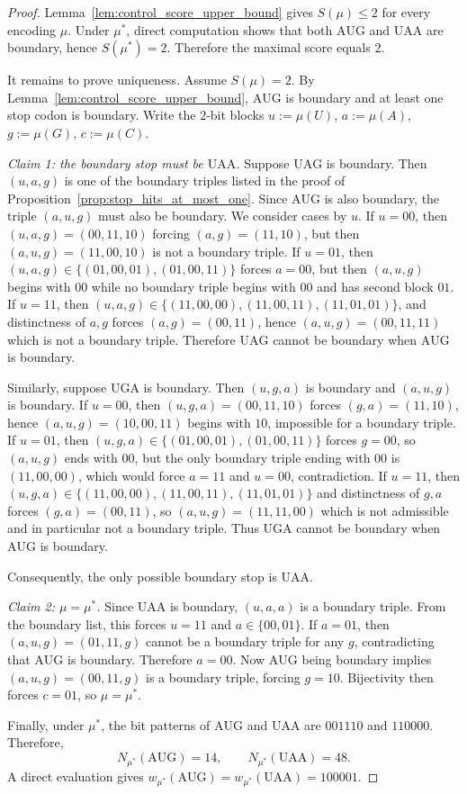 \begin{proof}
Lemma~\ref{lem:control_score_upper_bound} gives $S(\mu)\le 2$ for every encoding $\mu$.
Under $\mu^\ast$, direct computation shows that both $\mathrm{AUG}$ and $\mathrm{UAA}$ are boundary, hence $S(\mu^\ast)=2$.
Therefore the maximal score equals $2$.

It remains to prove uniqueness.
Assume $S(\mu)=2$.
By Lemma~\ref{lem:control_score_upper_bound}, $\mathrm{AUG}$ is boundary and at least one stop codon is boundary.
Write the $2$-bit blocks $u:=\mu(U)$, $a:=\mu(A)$, $g:=\mu(G)$, $c:=\mu(C)$.

\emph{Claim 1: the boundary stop must be $\mathrm{UAA}$.}
Suppose $\mathrm{UAG}$ is boundary.
Then $(u,a,g)$ is one of the boundary triples listed in the proof of Proposition~\ref{prop:stop_hits_at_most_one}.
Since $\mathrm{AUG}$ is also boundary, the triple $(a,u,g)$ must also be boundary.
We consider cases by $u$.
If $u=00$, then $(u,a,g)=(00,11,10)$ forcing $(a,g)=(11,10)$, but then $(a,u,g)=(11,00,10)$ is not a boundary triple.
If $u=01$, then $(u,a,g)\in\{(01,00,01),(01,00,11)\}$ forces $a=00$, but then $(a,u,g)$ begins with $00$ while no boundary triple begins with $00$ and has second block $01$.
If $u=11$, then $(u,a,g)\in\{(11,00,00),(11,00,11),(11,01,01)\}$, and distinctness of $a,g$ forces $(a,g)=(00,11)$, hence $(a,u,g)=(00,11,11)$ which is not a boundary triple.
Therefore $\mathrm{UAG}$ cannot be boundary when $\mathrm{AUG}$ is boundary.

Similarly, suppose $\mathrm{UGA}$ is boundary.
Then $(u,g,a)$ is boundary and $(a,u,g)$ is boundary.
If $u=00$, then $(u,g,a)=(00,11,10)$ forces $(g,a)=(11,10)$, hence $(a,u,g)=(10,00,11)$ begins with $10$, impossible for a boundary triple.
If $u=01$, then $(u,g,a)\in\{(01,00,01),(01,00,11)\}$ forces $g=00$, so $(a,u,g)$ ends with $00$, but the only boundary triple ending with $00$ is $(11,00,00)$, which would force $a=11$ and $u=00$, contradiction.
If $u=11$, then $(u,g,a)\in\{(11,00,00),(11,00,11),(11,01,01)\}$ and distinctness of $g,a$ forces $(g,a)=(00,11)$, so $(a,u,g)=(11,11,00)$ which is not admissible and in particular not a boundary triple.
Thus $\mathrm{UGA}$ cannot be boundary when $\mathrm{AUG}$ is boundary.

Consequently, the only possible boundary stop is $\mathrm{UAA}$.

\emph{Claim 2: $\mu=\mu^\ast$.}
Since $\mathrm{UAA}$ is boundary, $(u,a,a)$ is a boundary triple.
From the boundary list, this forces $u=11$ and $a\in\{00,01\}$.
If $a=01$, then $(a,u,g)=(01,11,g)$ cannot be a boundary triple for any $g$, contradicting that $\mathrm{AUG}$ is boundary.
Therefore $a=00$.
Now $\mathrm{AUG}$ being boundary implies $(a,u,g)=(00,11,g)$ is a boundary triple, forcing $g=10$.
Bijectivity then forces $c=01$, so $\mu=\mu^\ast$.

Finally, under $\mu^\ast$, the bit patterns of $\mathrm{AUG}$ and $\mathrm{UAA}$ are $001110$ and $110000$.
Therefore,
\[
N_{\mu^\ast}(\mathrm{AUG})=14,\qquad N_{\mu^\ast}(\mathrm{UAA})=48.
\]
A direct evaluation gives $w_{\mu^\ast}(\mathrm{AUG})=w_{\mu^\ast}(\mathrm{UAA})=100001$.
\end{proof}

